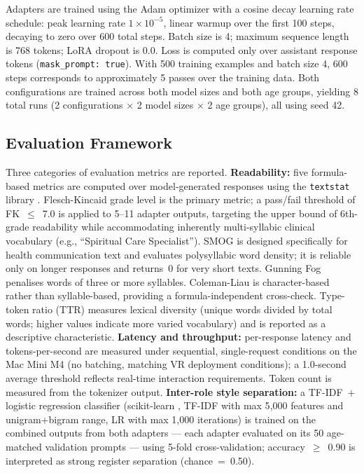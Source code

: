\documentclass[journal]{IEEEtai}
\begin{document}
Adapters are trained using the Adam optimizer with a cosine decay learning rate schedule: peak learning rate $1 \times 10^{-5}$, linear warmup over the first 100 steps, decaying to zero over 600 total steps. Batch size is 4; maximum sequence length is 768 tokens; LoRA dropout is 0.0. Loss is computed only over assistant response tokens (\texttt{mask\_prompt: true}). With 500 training examples and batch size 4, 600 steps corresponds to approximately 5 passes over the training data. Both configurations are trained across both model sizes and both age groups, yielding 8 total runs (2 configurations $\times$ 2 model sizes $\times$ 2 age groups), all using seed 42.

\subsection{Evaluation Framework}

Three categories of evaluation metrics are reported. \textbf{Readability:} five formula-based metrics are computed over model-generated responses using the \texttt{textstat} library \cite{bansal2023textstat}. Flesch-Kincaid grade level \cite{kincaid1975fk} is the primary metric; a pass/fail threshold of FK~$\leq$~7.0 is applied to 5--11 adapter outputs, targeting the upper bound of 6th-grade readability while accommodating inherently multi-syllabic clinical vocabulary (e.g., ``Spiritual Care Specialist''). SMOG \cite{mclaughlin1969smog} is designed specifically for health communication text and evaluates polysyllabic word density; it is reliable only on longer responses and returns~0 for very short texts. Gunning Fog \cite{gunning1952fog} penalises words of three or more syllables. Coleman-Liau \cite{coleman1975cli} is character-based rather than syllable-based, providing a formula-independent cross-check. Type-token ratio (TTR) measures lexical diversity (unique words divided by total words; higher values indicate more varied vocabulary) and is reported as a descriptive characteristic. \textbf{Latency and throughput:} per-response latency and tokens-per-second are measured under sequential, single-request conditions on the Mac Mini M4 (no batching, matching VR deployment conditions); a 1.0-second average threshold reflects real-time interaction requirements. Token count is measured from the tokenizer output. \textbf{Inter-role style separation:} a TF-IDF~$+$ logistic regression classifier (scikit-learn \cite{pedregosa2011sklearn}, TF-IDF with max 5{,}000 features and unigram+bigram range, LR with max 1{,}000 iterations) is trained on the combined outputs from both adapters --- each adapter evaluated on its 50 age-matched validation prompts --- using 5-fold cross-validation; accuracy~$\geq$~0.90 is interpreted as strong register separation (chance~=~0.50).
\end{document}
